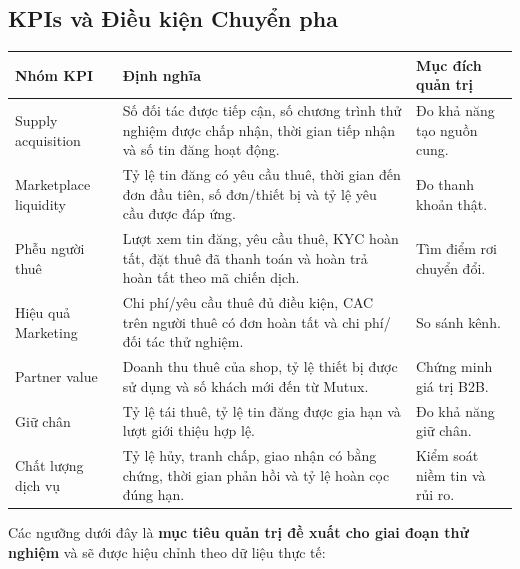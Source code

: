 \subsection{KPIs và Điều kiện Chuyển pha}

\begin{longtable}{@{}p{}p{}p{}@{}}
\toprule
\textbf{Nhóm KPI} & \textbf{Định nghĩa} & \textbf{Mục đích quản trị} \\
\midrule
\endhead
Supply acquisition & Số đối tác được tiếp cận, số chương trình thử nghiệm được chấp nhận, thời gian tiếp nhận và số tin đăng hoạt động. & Đo khả năng tạo nguồn cung. \\
Marketplace liquidity & Tỷ lệ tin đăng có yêu cầu thuê, thời gian đến đơn đầu tiên, số đơn/thiết bị và tỷ lệ yêu cầu được đáp ứng. & Đo thanh khoản thật. \\
Phễu người thuê & Lượt xem tin đăng, yêu cầu thuê, KYC hoàn tất, đặt thuê đã thanh toán và hoàn trả hoàn tất theo mã chiến dịch. & Tìm điểm rơi chuyển đổi. \\
Hiệu quả Marketing & Chi phí/yêu cầu thuê đủ điều kiện, CAC trên người thuê có đơn hoàn tất và chi phí/đối tác thử nghiệm. & So sánh kênh. \\
Partner value & Doanh thu thuê của shop, tỷ lệ thiết bị được sử dụng và số khách mới đến từ Mutux. & Chứng minh giá trị B2B. \\
Giữ chân & Tỷ lệ tái thuê, tỷ lệ tin đăng được gia hạn và lượt giới thiệu hợp lệ. & Đo khả năng giữ chân. \\
Chất lượng dịch vụ & Tỷ lệ hủy, tranh chấp, giao nhận có bằng chứng, thời gian phản hồi và tỷ lệ hoàn cọc đúng hạn. & Kiểm soát niềm tin và rủi ro. \\
\bottomrule
\end{longtable}

Các ngưỡng dưới đây là \textbf{mục tiêu quản trị đề xuất cho giai đoạn thử nghiệm} và sẽ được hiệu chỉnh theo dữ liệu thực tế:


